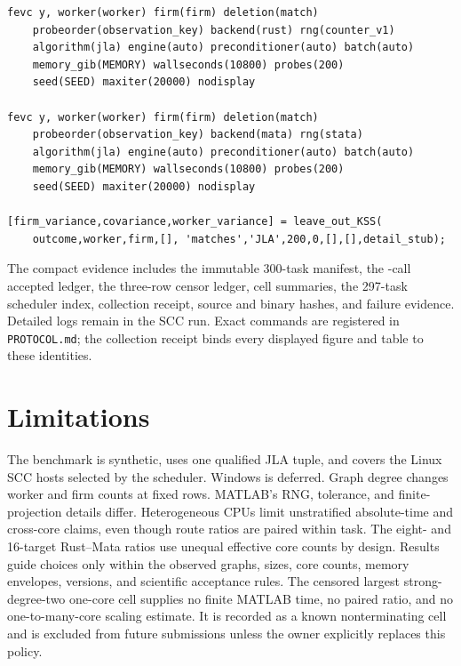 \documentclass[11pt]{article}
\begin{document}
\begin{verbatim}
fevc y, worker(worker) firm(firm) deletion(match)
    probeorder(observation_key) backend(rust) rng(counter_v1)
    algorithm(jla) engine(auto) preconditioner(auto) batch(auto)
    memory_gib(MEMORY) wallseconds(10800) probes(200)
    seed(SEED) maxiter(20000) nodisplay

fevc y, worker(worker) firm(firm) deletion(match)
    probeorder(observation_key) backend(mata) rng(stata)
    algorithm(jla) engine(auto) preconditioner(auto) batch(auto)
    memory_gib(MEMORY) wallseconds(10800) probes(200)
    seed(SEED) maxiter(20000) nodisplay

[firm_variance,covariance,worker_variance] = leave_out_KSS(
    outcome,worker,firm,[], 'matches','JLA',200,0,[],[],detail_stub);
\end{verbatim}

The compact evidence includes the immutable 300-task manifest, the
\EstimatorCalls{}-call accepted ledger, the three-row censor ledger, cell
summaries, the 297-task scheduler index, collection receipt, source and binary
hashes, and failure evidence. Detailed logs remain in the SCC run. Exact
commands are registered in \texttt{PROTOCOL.md}; the collection receipt binds
every displayed figure and table to these identities.

\section{Limitations}

The benchmark is synthetic, uses one qualified JLA tuple, and covers the Linux
SCC hosts selected by the scheduler. Windows is deferred. Graph degree changes
worker and firm counts at fixed rows. MATLAB's RNG, tolerance, and finite-
projection details differ. Heterogeneous CPUs limit unstratified absolute-time
and cross-core claims, even though route ratios are paired within task. The
eight- and 16-target Rust--Mata ratios use unequal effective core counts by
design. Results guide choices only within the observed graphs, sizes, core counts, memory
envelopes, versions, and scientific acceptance rules.
The censored largest strong-degree-two one-core cell supplies no finite MATLAB
time, no paired ratio, and no one-to-many-core scaling estimate. It is recorded
as a known nonterminating cell and is excluded from future submissions unless
the owner explicitly replaces this policy.
\end{document}
